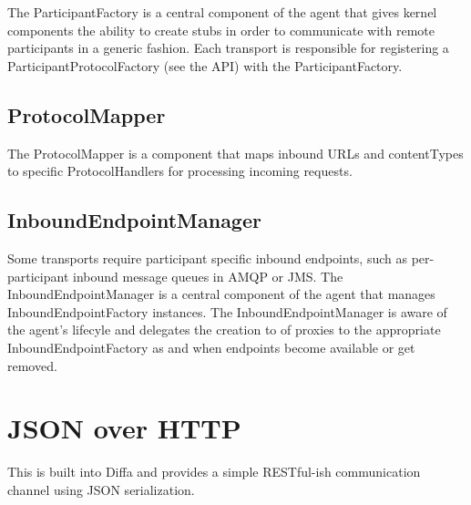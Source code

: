 The ParticipantFactory is a central component of the agent that gives kernel components the ability to create stubs in order to communicate with remote participants in a generic fashion. Each transport is responsible for registering a ParticipantProtocolFactory (see the API) with the ParticipantFactory. 

\subsection{ProtocolMapper}

The ProtocolMapper is a component that maps inbound URLs and contentTypes to specific ProtocolHandlers for processing incoming requests.

\subsection{InboundEndpointManager}

Some transports require participant specific inbound endpoints, such as per-participant inbound message queues in AMQP or JMS. The InboundEndpointManager is a central component of the agent that manages InboundEndpointFactory instances. The InboundEndpointManager is aware of the agent's lifecyle and delegates the creation to of proxies to the appropriate InboundEndpointFactory as and when endpoints become available or get removed.

\section{JSON over HTTP}

This is built into Diffa and provides a simple RESTful-ish communication channel using JSON serialization.

